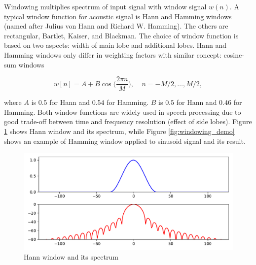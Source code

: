 Windowing multiplies spectrum of input signal with window signal $w(n)$.  A
typical window function for acoustic signal is Hann and Hamming windows (named
after Julius von Hann and Richard W. Hamming).  The others are rectangular,
Bartlet, Kaiser, and Blackman.  The choice of window function is based
on two aspects: width of main lobe and additional lobes. Hann and Hamming
windows only differ in weighting factors with similar concept: cosine-sum
windows

\begin{equation}
  w[n] = A + B \cos \biggl(\frac {2\pi n}{M}\biggl), ~~~~~n = -M/2, \ldots, M/2,
\end{equation}

\noindent where $A$ is $0.5$ for Hann and $0.54$ for Hamming. $B$ is $0.5$ for
Hann and $0.46$ for Hamming. Both window functions are widely used in speech
processing due to good trade-off between time and frequency resolution (effect
of side lobes). Figure \ref{fig:window_hann} shows Hann window and its spectrum,
while Figure \ref{fig:windowing_demo} shows an example of Hamming window applied
to sinusoid signal and its result.

\begin{figure}[htbp]
  \centering
  \includegraphics[width=\textwidth]{../fig/window_hann.pdf}
  \caption{Hann window and its spectrum}
  \label{fig:window_hann}
\end{figure}

